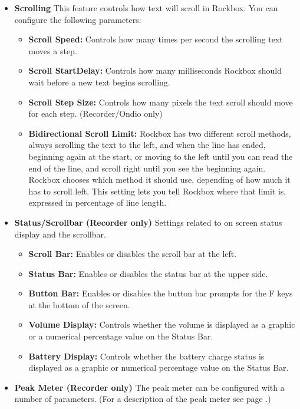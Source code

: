 \begin{itemize}
\item \textbf{Scrolling}
This feature controls how text will scroll in Rockbox. You can configure
the following parameters:

\begin{itemize}
\item \textbf{Scroll Speed:} 
Controls how many times per second the scrolling text moves a step.
\item \textbf{Scroll StartDelay:} 
Controls how many milliseconds Rockbox should wait before a new text begins scrolling.
\item \textbf{Scroll Step Size:}
Controls how many pixels the text scroll should move for each step. (Recorder/Ondio only)
\item \textbf{Bidirectional Scroll Limit: }
Rockbox has two different scroll methods,  always scrolling the text to the left, and when the line has ended, beginning again at the start, or moving to the
left until you can read the end of the line, and scroll right until you
see the beginning again. Rockbox chooses which method it should use,
depending of how much it has to scroll left. This setting lets you tell
Rockbox where that limit is, expressed in percentage of line length.
\end{itemize}

\item \textbf{Status/Scrollbar (Recorder only)}
Settings related to on screen status display and the scrollbar.

\begin{itemize}
\item \textbf{Scroll Bar: }Enables or disables the scroll bar at the
left.
\item \textbf{Status Bar: }Enables or disables the status bar
at the upper side.
\item \textbf{Button Bar:} Enables or disables the button bar prompts
for the F keys at the bottom of the screen.
\item \textbf{Volume Display:} Controls whether the volume is displayed
as a graphic or a numerical percentage value on the Status Bar.
\item \textbf{Battery Display: }Controls whether the battery charge
status is displayed as a graphic or numerical percentage value on the
Status Bar.
\end{itemize}

\item \textbf{Peak Meter (Recorder only) }
The peak meter can be configured with a number of parameters.  (For a description of the peak meter see page \pageref{ref:Peakmeter}.)


\end{itemize}
